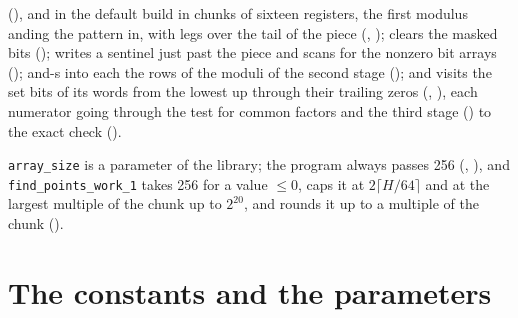 \begin{enumerate}
    (), and in the default build in chunks of sixteen registers, the
    first modulus anding the pattern in, with legs over the tail of the piece
    (, ); clears the masked bits
    (); writes a sentinel just past the piece and scans for the
    nonzero bit arrays (); and-s into each the rows of the moduli of
    the second stage (); and visits the set bits of its words from the
    lowest up through their trailing zeros (,
    ), each numerator going through the test for common factors and
    the third stage () to the exact check
    ().
\end{enumerate}
\verb|array_size| is a parameter of the library; the program always passes 256
(, ), and \verb|find_points_work_1| takes 256
for a value $\le 0$, caps it at $2 \lceil H/64 \rceil$ and at the largest multiple of the chunk up
to $2^{20}$, and rounds it up to a multiple of the chunk ().

\section{The constants and the parameters}\label{sec:wordsParams}

